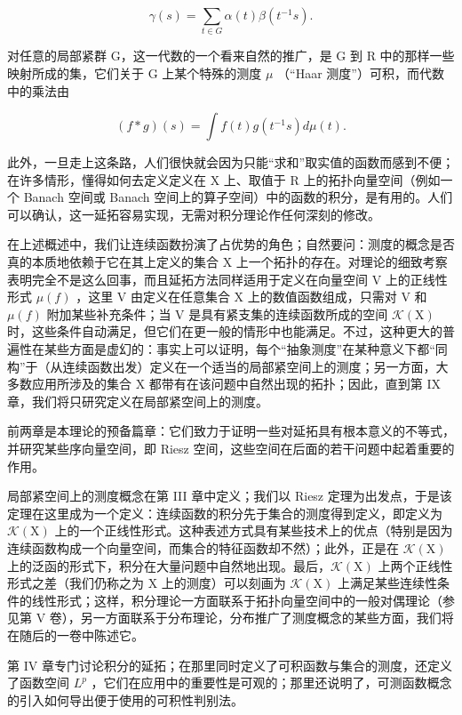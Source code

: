 \[
\gamma (s) = \sum_ {t \in G} \alpha (t) \beta (t ^ {- 1} s).
\]

对任意的局部紧群 G，这一代数的一个看来自然的推广，是 G 到 R 中的那样一些映射所成的集，它们关于 G 上某个特殊的测度 \(\mu\) （“Haar 测度”）可积，而代数中的乘法由

\[
(f * g) (s) = \int f (t) g (t ^ {- 1} s) d \mu (t).
\]

此外，一旦走上这条路，人们很快就会因为只能“求和”取实值的函数而感到不便；在许多情形，懂得如何去定义定义在 X 上、取值于 R 上的拓扑向量空间（例如一个 Banach 空间或 Banach 空间上的算子空间）中的函数的积分，是有用的。人们可以确认，这一延拓容易实现，无需对积分理论作任何深刻的修改。

在上述概述中，我们让连续函数扮演了占优势的角色；自然要问：测度的概念是否真的本质地依赖于它在其上定义的集合 X 上一个拓扑的存在。对理论的细致考察表明完全不是这么回事，而且延拓方法同样适用于定义在向量空间 V 上的正线性形式 \(\mu(f)\) ，这里 V 由定义在任意集合 X 上的数值函数组成，只需对 V 和 \(\mu(f)\) 附加某些补充条件；当 V 是具有紧支集的连续函数所成的空间 \(\mathcal{K}(\mathrm{X})\) 时，这些条件自动满足，但它们在更一般的情形中也能满足。不过，这种更大的普遍性在某些方面是虚幻的：事实上可以证明，每个“抽象测度”在某种意义下都“同构”于（从连续函数出发）定义在一个适当的局部紧空间上的测度；另一方面，大多数应用所涉及的集合 X 都带有在该问题中自然出现的拓扑；因此，直到第 IX 章，我们将只研究定义在局部紧空间上的测度。

前两章是本理论的预备篇章：它们致力于证明一些对延拓具有根本意义的不等式，并研究某些序向量空间，即 Riesz 空间，这些空间在后面的若干问题中起着重要的作用。

局部紧空间上的测度概念在第 III 章中定义；我们以 Riesz 定理为出发点，于是该定理在这里成为一个定义：连续函数的积分先于集合的测度得到定义，即定义为 \(\mathcal{K}(\mathrm{X})\) 上的一个正线性形式。这种表述方式具有某些技术上的优点（特别是因为连续函数构成一个向量空间，而集合的特征函数却不然）；此外，正是在 \(\mathcal{K}(\mathrm{X})\) 上的泛函的形式下，积分在大量问题中自然地出现。最后，\(\mathcal{K}(\mathrm{X})\) 上两个正线性形式之差（我们仍称之为 X 上的测度）可以刻画为 \(\mathcal{K}(\mathrm{X})\) 上满足某些连续性条件的线性形式；这样，积分理论一方面联系于拓扑向量空间中的一般对偶理论（参见第 V 卷），另一方面联系于分布理论，分布推广了测度概念的某些方面，我们将在随后的一卷中陈述它。

第 IV 章专门讨论积分的延拓；在那里同时定义了可积函数与集合的测度，还定义了函数空间 \(L^{p}\) ，它们在应用中的重要性是可观的；那里还说明了，可测函数概念的引入如何导出便于使用的可积性判别法。

